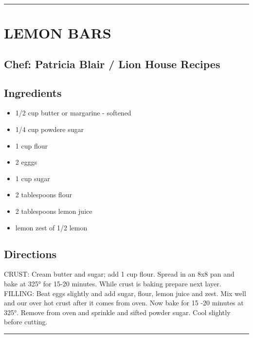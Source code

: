 \documentclass[
]{book}
\providecommand{\tightlist}{%
  \setlength{\itemsep}{0pt}\setlength{\parskip}{0pt}}
\begin{document}
\begin{center}\rule{0.5\linewidth}{0.5pt}\end{center}

\hypertarget{lemon-bars}{%
\section*{LEMON BARS}\label{lemon-bars}}


\hypertarget{chef-patricia-blair-lion-house-recipes}{%
\subsection*{Chef: Patricia Blair / Lion House Recipes}\label{chef-patricia-blair-lion-house-recipes}}


\hypertarget{ingredients-84}{%
\subsection*{Ingredients}\label{ingredients-84}}


\begin{itemize}
\tightlist
\item
  1/2 cup butter or margarine - softened
\item
  1/4 cup powdere sugar
\item
  1 cup flour
\item
  2 egggs
\item
  1 cup sugar
\item
  2 tablespoons flour
\item
  2 tablespoons lemon juice
\item
  lemon zest of 1/2 lemon
\end{itemize}

\hypertarget{directions-84}{%
\subsection*{Directions}\label{directions-84}}


CRUST: Cream butter and sugar; add 1 cup flour. Spread in an 8x8 pan and bake at 325° for 15-20 minutes. While crust is baking prepare next layer. FILLING: Beat eggs slightly and add sugar, flour, lemon juice and zest. Mix well and our over hot crust after it comes from oven. Now bake for 15 -20 minutes at 325°. Remove from oven and sprinkle and sifted powder sugar. Cool slightly before cutting.

\begin{center}\rule{0.5\linewidth}{0.5pt}\end{center}
\end{document}
